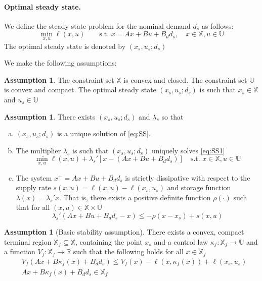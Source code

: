 \documentclass{elsarticle}
\theoremstyle{definition}
\newtheorem{assumption}[theorem]{Assumption}
\begin{document}
\paragraph{Optimal steady state.}
We define the steady-state problem for the nominal demand $d_s$ as follows:
\begin{equation}
\label{eq:SS}
\min_{x,u}{\ell(x,u)} \qquad \text{s.t.~} x = Ax + Bu + B_dd_s, \quad x \in
\mathbb{X}, u \in \mathbb{U}
\end{equation}
The optimal steady state is denoted by $(x_s,u_s;d_s)$

We make the following assumptions:
\begin{assumption}
\label{ass:closed}
The constraint set $\mathbb{X}$ is convex and  closed. The constraint set
$\mathbb{U}$ is convex and compact. The optimal steady state $(x_s,u_s;d_s)$
is such that $x_s \in \mathbb{X}$ and $u_s \in \mathbb{U}$
\end{assumption}

\begin{assumption}
\label{ass:strict_dissipativity}
There exists $(x_s,u_s;d_s)$ and $\lambda_s$ so that 
\begin{enumerate}[(a)]
\item $(x_s,u_s;d_s)$  is a unique solution of \eqref{eq:SS}.
\item The multiplier $\lambda_s$ is such that $(x_s,u_s;d_s)$
  uniquely solves \eqref{eq:SS1}
\begin{equation}
\label{eq:SS1}
\min_{x,u}{\ell(x,u)+\lambda_s'[x-(Ax+Bu+B_dd_s)]} \quad \text{s.t.~}
  x \in \mathbb{X}, u \in \mathbb{U}
\end{equation}
\item The system $x^+=Ax+Bu+B_dd_s$ is strictly dissipative with respect
  to the supply rate $s(x,u) = \ell(x,u)-\ell(x_s,u_s)$ and
  storage function $\lambda(x) = \lambda_s'x$. That is, there exists a
  positive definite function $\rho(\cdot)$ such that
for all $(x,u) \in \mathbb{X} \times \mathbb{U}$
\begin{equation}
\label{eq:esc:strict_dissipativity}
\lambda_s'(Ax+Bu+B_dd_s-x) \leq -\rho (x-x_s)+s(x,u)
\end{equation}
\end{enumerate}
\end{assumption}

\begin{assumption}[Basic stability assumption]
\label{ass:bsa}
There exists a convex, compact terminal region $\mathbb{X}_f \subseteq
\mathbb{X}$, containing the point $x_s$  and a control
law $\kappa_f: \mathbb{X}_f \rightarrow \mathbb{U}$  and a function
$V_f:\mathbb{X}_f \rightarrow \mathbb{R}$ such that the
following holds for all $x \in \mathbb{X}_f$
\begin{align}
\label{eq:BSA}
&V_f(Ax+B\kappa_f(x)+B_dd_s) \leq V_f(x)-\ell(x,\kappa_f(x))+\ell(x_s,u_s) \\
\label{eq:esc:invariant}
&Ax+ B\kappa_f(x) +B_dd_s \in \mathbb{X}_f
\end{align}
\end{assumption}
\end{document}
